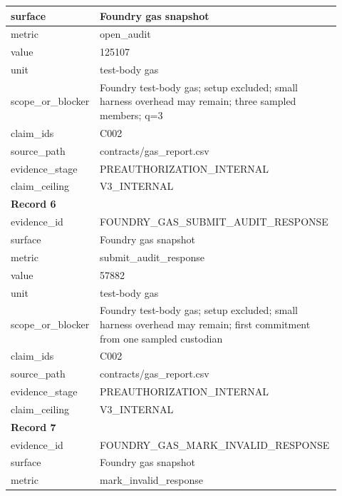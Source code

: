 \begin{longtable}{|p{0.24\linewidth}|p{0.68\linewidth}|}
surface & Foundry gas snapshot \\ \hline
metric & open\_\allowbreak{}audit \\ \hline
value & 125107 \\ \hline
unit & test-body gas \\ \hline
scope\_\allowbreak{}or\_\allowbreak{}blocker & Foundry test-body gas;\allowbreak{} setup excluded;\allowbreak{} small harness overhead may remain;\allowbreak{} three sampled members;\allowbreak{} q=3 \\ \hline
claim\_\allowbreak{}ids & C002 \\ \hline
source\_\allowbreak{}path & contracts/gas\_\allowbreak{}report.csv \\ \hline
evidence\_\allowbreak{}stage & PREAUTHORIZATION\_\allowbreak{}INTERNAL \\ \hline
claim\_\allowbreak{}ceiling & V3\_\allowbreak{}INTERNAL \\ \hline
\multicolumn{2}{|l|}{\textbf{Record 6}} \\ \hline
evidence\_\allowbreak{}id & FOUNDRY\_\allowbreak{}GAS\_\allowbreak{}SUBMIT\_\allowbreak{}AUDIT\_\allowbreak{}RESPONSE \\ \hline
surface & Foundry gas snapshot \\ \hline
metric & submit\_\allowbreak{}audit\_\allowbreak{}response \\ \hline
value & 57882 \\ \hline
unit & test-body gas \\ \hline
scope\_\allowbreak{}or\_\allowbreak{}blocker & Foundry test-body gas;\allowbreak{} setup excluded;\allowbreak{} small harness overhead may remain;\allowbreak{} first commitment from one sampled custodian \\ \hline
claim\_\allowbreak{}ids & C002 \\ \hline
source\_\allowbreak{}path & contracts/gas\_\allowbreak{}report.csv \\ \hline
evidence\_\allowbreak{}stage & PREAUTHORIZATION\_\allowbreak{}INTERNAL \\ \hline
claim\_\allowbreak{}ceiling & V3\_\allowbreak{}INTERNAL \\ \hline
\multicolumn{2}{|l|}{\textbf{Record 7}} \\ \hline
evidence\_\allowbreak{}id & FOUNDRY\_\allowbreak{}GAS\_\allowbreak{}MARK\_\allowbreak{}INVALID\_\allowbreak{}RESPONSE \\ \hline
surface & Foundry gas snapshot \\ \hline
metric & mark\_\allowbreak{}invalid\_\allowbreak{}response \\ \hline

\end{longtable}
